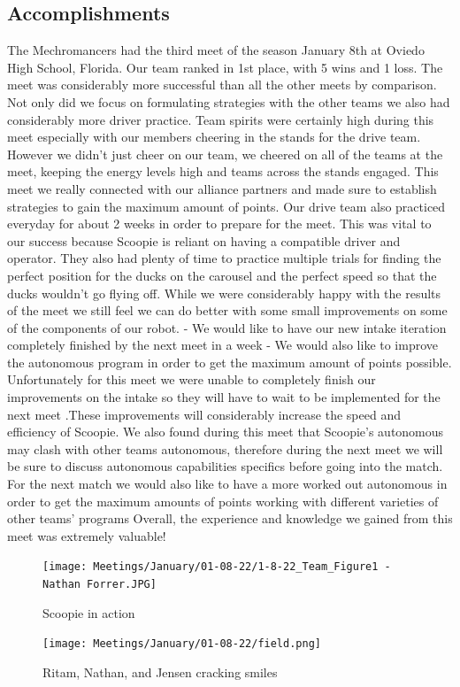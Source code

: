 \subsection*{Accomplishments}
The Mechromancers had the third meet of the season January 8th at Oviedo High School, Florida. Our team ranked in 1st place, with 5 wins and 1 loss. The meet was considerably more successful than all the other meets by comparison. Not only did we focus on formulating strategies with the other teams we also had considerably more driver practice. Team spirits were certainly high during this meet especially with our members cheering in the stands for the drive team. However we didn't just cheer on our team, we cheered on all of the teams at the meet, keeping the energy levels high and teams across the stands engaged. This meet we really connected with our alliance partners and made sure to establish strategies to gain the maximum amount of points. Our drive team also practiced everyday for about 2 weeks in order to prepare for the meet. This was vital to our success because Scoopie is reliant on having a compatible driver and operator. They also had plenty of time to practice multiple trials for finding the perfect position for the ducks on the carousel and the perfect speed so that the ducks wouldn’t go flying off. While we were considerably happy with the results of the meet we still feel we can do better with some small improvements on some of the components of our robot. 
- We would like to have our new intake iteration completely finished by the next meet in a week
- We would also like to improve the autonomous program in order to get the maximum amount of points possible.
Unfortunately for this meet we were unable to completely finish our improvements on the intake so they will have to wait to be implemented for the next meet .These improvements will considerably increase the speed and efficiency of Scoopie. We also found during this meet that Scoopie's autonomous may clash with other teams autonomous, therefore during the next meet we will be sure to discuss autonomous capabilities specifics before going into the match. For the next match we would also like to have a more worked out autonomous in order to get the maximum amounts of points working with different varieties of other teams’ programs 
Overall, the experience and knowledge we gained from this meet was extremely valuable! 

 

\begin{figure}[ht]
\centering
\begin{minipage}[b]{.48\textwidth}
  \centering
  \texttt{[image: Meetings/January/01-08-22/1-8-22\_Team\_Figure1 - Nathan Forrer.JPG]}
  \caption{Scoopie in action}
  \label{fig:010822_5}
\end{minipage}%
\hfill%
\begin{minipage}[b]{.48\textwidth}
  \centering
  \texttt{[image: Meetings/January/01-08-22/field.png]}
  \caption{Ritam, Nathan, and Jensen cracking smiles}
  \label{fig:010822_6}
\end{minipage}
\end{figure}

